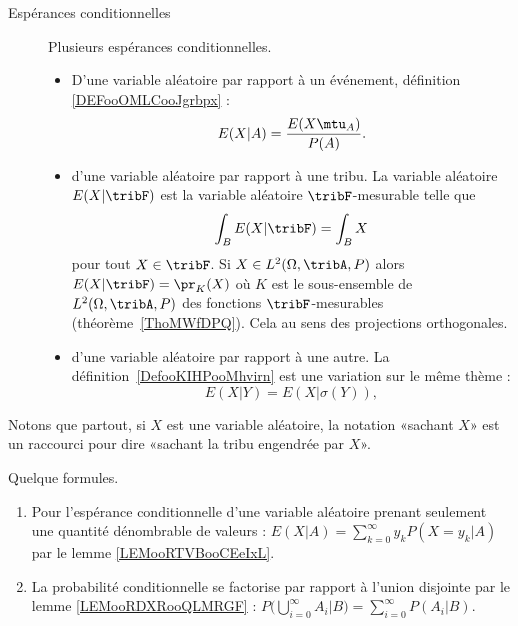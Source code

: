 \begin{description}
\begin{itemize}
	      \end{itemize}
	\item[Espérances conditionnelles]
	      Plusieurs espérances conditionnelles.
	      \begin{itemize}
		      \item
		            D'une variable aléatoire par rapport à un événement, définition \ref{DEFooOMLCooJgrbpx} :
		            \begin{equation}
			            E(X|A)=\frac{ E(X\mtu_A) }{ P(A) }.
		            \end{equation}
		      \item d'une variable aléatoire par rapport à une tribu. La variable aléatoire \( E(X|\tribF)\) est la variable aléatoire \( \tribF\)-mesurable telle que
		            \begin{equation*}
			            \int_BE(X|\tribF)=\int_BX
		            \end{equation*}
		            pour tout \( X\in \tribF\). Si \( X\in L^2(\Omega,\tribA,P)\) alors \( E(X|\tribF)=\pr_K(X)\) où \( K\) est le sous-ensemble de \( L^2(\Omega,\tribA,P)\) des fonctions \( \tribF\)-mesurables (théorème~\ref{ThoMWfDPQ}). Cela au sens des projections orthogonales.


		      \item d'une variable aléatoire par rapport à une autre. La définition~\ref{DefooKIHPooMhvirn} est une variation sur le même thème :
		            \begin{equation*}
			            E(X|Y)=E(X|\sigma(Y)),
		            \end{equation*}

	      \end{itemize}

\end{description}

Notons que partout, si \( X\) est une variable aléatoire, la notation «sachant \( X\)» est un raccourci pour dire «sachant la tribu engendrée par \( X\)».

Quelque formules.
\begin{enumerate}
	\item
	      Pour l'espérance conditionnelle d'une variable aléatoire prenant seulement une quantité dénombrable de valeurs :
	      \( E(X|A)=\sum_{k=0}^{\infty}y_kP(X=y_k|A)\) par le lemme \ref{LEMooRTVBooCEeIxL}.
	\item
	      La probabilité conditionnelle se factorise par rapport à l'union disjointe par le lemme \ref{LEMooRDXRooQLMRGF} : \( P\big( \bigcup_{i=0}^{\infty}A_i|B \big)=\sum_{i=0}^{\infty}P(A_i|B)\).
\end{enumerate}

